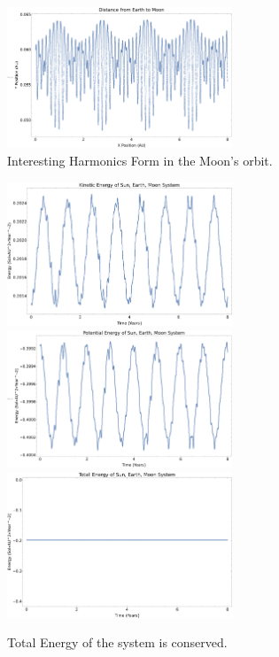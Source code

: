 \documentclass{article}
\begin{document}
\begin{figure}[!htb]
	\begin{center}
		\includegraphics[width=0.6\textwidth]{images/p1-2c.pdf}
	\end{center}
	\caption{Interesting Harmonics Form in the Moon's orbit.}
\label{fig:qual}
\end{figure}
\FloatBarrier


\begin{figure}[!htb]
	\begin{center}
		\includegraphics[width=0.6\textwidth]{images/p1-2d.pdf}
		\includegraphics[width=0.6\textwidth]{images/p1-2e.pdf}
		\includegraphics[width=0.6\textwidth]{images/p1-2f.pdf}
	\end{center}
	\caption{Total Energy of the system is conserved.}
\label{fig:qual}
\end{figure}
\FloatBarrier
\end{document}
